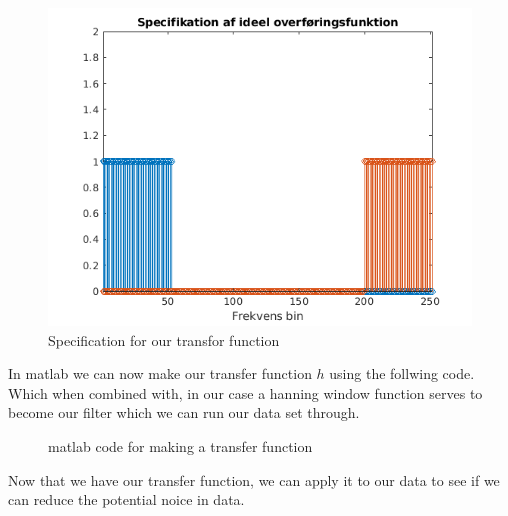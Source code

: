 \begin{figure}[h]
  \centering
  \includegraphics[scale = 0.5]{matlabStuff/Specification_of_transfer_function.png}
  \caption{Specification for our transfor function}%
  \label{fig:specificatiion}
\end{figure}

\newpage

In matlab we can now make our transfer function $h$ using the follwing code. Which when combined with, in our case a hanning window function serves to become our filter which we can run our
data set through.

\begin{figure}[h]
  \centering
  
  \caption{matlab code for making a transfer function}%
  \label{}
\end{figure}



Now that we have our transfer function, we can apply it to our data to see if we can reduce the potential noice in data.

